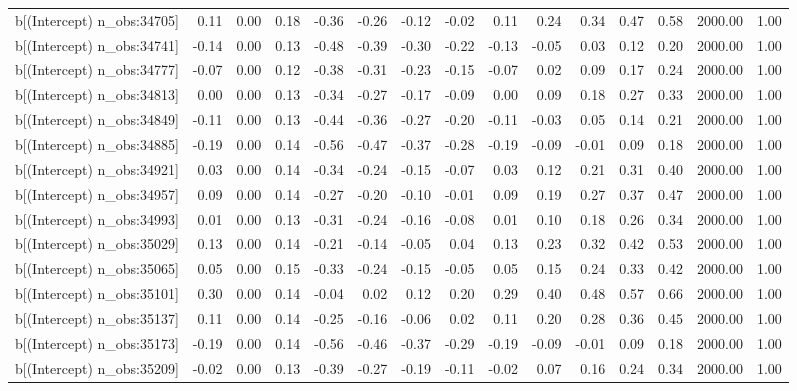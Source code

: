 \begin{table}[ht]
\begin{tabular}{rrrrrrrrrrrrrrr}
  b[(Intercept) n\_obs:34705] & 0.11 & 0.00 & 0.18 & -0.36 & -0.26 & -0.12 & -0.02 & 0.11 & 0.24 & 0.34 & 0.47 & 0.58 & 2000.00 & 1.00 \\ 
  b[(Intercept) n\_obs:34741] & -0.14 & 0.00 & 0.13 & -0.48 & -0.39 & -0.30 & -0.22 & -0.13 & -0.05 & 0.03 & 0.12 & 0.20 & 2000.00 & 1.00 \\ 
  b[(Intercept) n\_obs:34777] & -0.07 & 0.00 & 0.12 & -0.38 & -0.31 & -0.23 & -0.15 & -0.07 & 0.02 & 0.09 & 0.17 & 0.24 & 2000.00 & 1.00 \\ 
  b[(Intercept) n\_obs:34813] & 0.00 & 0.00 & 0.13 & -0.34 & -0.27 & -0.17 & -0.09 & 0.00 & 0.09 & 0.18 & 0.27 & 0.33 & 2000.00 & 1.00 \\ 
  b[(Intercept) n\_obs:34849] & -0.11 & 0.00 & 0.13 & -0.44 & -0.36 & -0.27 & -0.20 & -0.11 & -0.03 & 0.05 & 0.14 & 0.21 & 2000.00 & 1.00 \\ 
  b[(Intercept) n\_obs:34885] & -0.19 & 0.00 & 0.14 & -0.56 & -0.47 & -0.37 & -0.28 & -0.19 & -0.09 & -0.01 & 0.09 & 0.18 & 2000.00 & 1.00 \\ 
  b[(Intercept) n\_obs:34921] & 0.03 & 0.00 & 0.14 & -0.34 & -0.24 & -0.15 & -0.07 & 0.03 & 0.12 & 0.21 & 0.31 & 0.40 & 2000.00 & 1.00 \\ 
  b[(Intercept) n\_obs:34957] & 0.09 & 0.00 & 0.14 & -0.27 & -0.20 & -0.10 & -0.01 & 0.09 & 0.19 & 0.27 & 0.37 & 0.47 & 2000.00 & 1.00 \\ 
  b[(Intercept) n\_obs:34993] & 0.01 & 0.00 & 0.13 & -0.31 & -0.24 & -0.16 & -0.08 & 0.01 & 0.10 & 0.18 & 0.26 & 0.34 & 2000.00 & 1.00 \\ 
  b[(Intercept) n\_obs:35029] & 0.13 & 0.00 & 0.14 & -0.21 & -0.14 & -0.05 & 0.04 & 0.13 & 0.23 & 0.32 & 0.42 & 0.53 & 2000.00 & 1.00 \\ 
  b[(Intercept) n\_obs:35065] & 0.05 & 0.00 & 0.15 & -0.33 & -0.24 & -0.15 & -0.05 & 0.05 & 0.15 & 0.24 & 0.33 & 0.42 & 2000.00 & 1.00 \\ 
  b[(Intercept) n\_obs:35101] & 0.30 & 0.00 & 0.14 & -0.04 & 0.02 & 0.12 & 0.20 & 0.29 & 0.40 & 0.48 & 0.57 & 0.66 & 2000.00 & 1.00 \\ 
  b[(Intercept) n\_obs:35137] & 0.11 & 0.00 & 0.14 & -0.25 & -0.16 & -0.06 & 0.02 & 0.11 & 0.20 & 0.28 & 0.36 & 0.45 & 2000.00 & 1.00 \\ 
  b[(Intercept) n\_obs:35173] & -0.19 & 0.00 & 0.14 & -0.56 & -0.46 & -0.37 & -0.29 & -0.19 & -0.09 & -0.01 & 0.09 & 0.18 & 2000.00 & 1.00 \\ 
  b[(Intercept) n\_obs:35209] & -0.02 & 0.00 & 0.13 & -0.39 & -0.27 & -0.19 & -0.11 & -0.02 & 0.07 & 0.16 & 0.24 & 0.34 & 2000.00 & 1.00 \\ 

\end{tabular}
\end{table}
